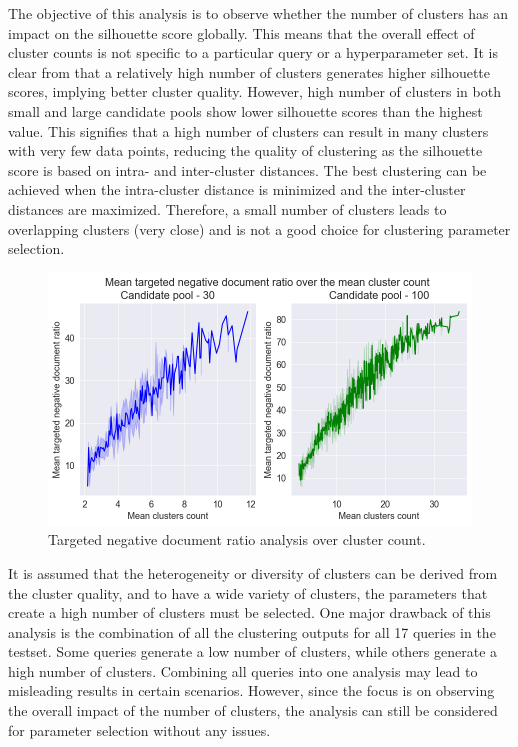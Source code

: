 The objective of this analysis is to observe whether the number of clusters has an impact on the silhouette score globally. This means that the overall effect of cluster counts is not specific to a particular query or a hyperparameter set. It is clear from  that a relatively high number of clusters generates higher silhouette scores, implying better cluster quality. However, high number of clusters in both small and large candidate pools show lower silhouette scores than the highest value. This signifies that a high number of clusters can result in many clusters with very few data points, reducing the quality of clustering as the silhouette score is based on intra- and inter-cluster distances. The best clustering can be achieved when the intra-cluster distance is minimized and the inter-cluster distances are maximized. Therefore, a small number of clusters leads to overlapping clusters (very close) and is not a good choice for clustering parameter selection.

\begin{figure}[h]
	\centering
	\includegraphics[width=.99\textwidth]{images/subplots/targetfn_score_ccnt_subplot.png}
	\caption[Targeted negative document ratio analysis.]{Targeted negative document ratio analysis over cluster count.  \label{fig:target_function_vs_cc}}
\end{figure}


It is assumed that the heterogeneity or diversity of clusters can be derived from the cluster quality, and to have a wide variety of clusters, the parameters that create a high number of clusters must be selected. One major drawback of this analysis is the combination of all the clustering outputs for all 17 queries in the testset. Some queries generate a low number of clusters, while others generate a high number of clusters. Combining all queries into one analysis may lead to misleading results in certain scenarios. However, since the focus is on observing the overall impact of the number of clusters, the analysis can still be considered for parameter selection without any issues.

